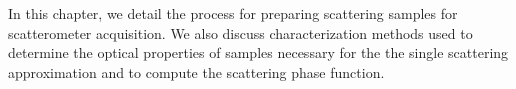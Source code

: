  \label{ch:sample_preparation}

In this chapter, we detail the process for preparing scattering samples for scatterometer acquisition. We also discuss characterization methods used to determine the optical properties of samples necessary for the the single scattering approximation and to compute the scattering phase function.

